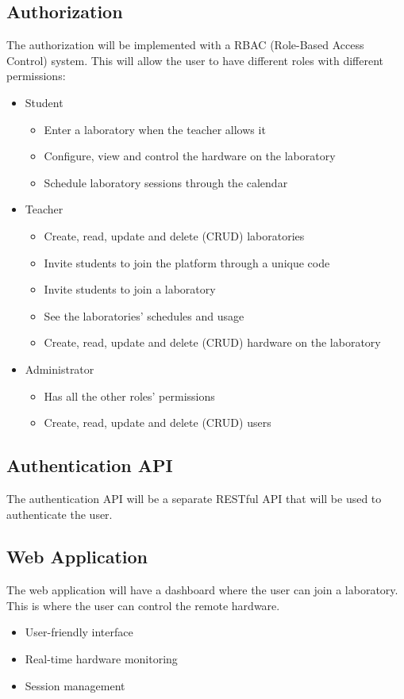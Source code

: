 \documentclass[a4paper,twoside,11pt]{article}
\begin{document}
\subsection*{Authorization}
The authorization will be implemented with a RBAC (Role-Based Access Control) system.
This will allow the user to have different roles with different permissions:
\begin{itemize}
    \item Student
	\begin{itemize}
		\item Enter a laboratory when the teacher allows it
		\item Configure, view and control the hardware on the laboratory
		\item Schedule laboratory sessions through the calendar
	\end{itemize}
	\item Teacher
	\begin{itemize}
		\item Create, read, update and delete (CRUD) laboratories
		\item Invite students to join the platform through a unique code
		\item Invite students to join a laboratory
		\item See the laboratories' schedules and usage
		\item Create, read, update and delete (CRUD) hardware on the laboratory
	\end{itemize}
	\item Administrator
	\begin{itemize}
		\item Has all the other roles' permissions
		\item Create, read, update and delete (CRUD) users
	\end{itemize}
\end{itemize}

\subsection*{Authentication API}
The authentication API will be a separate RESTful API that will be used to authenticate the user.

\subsection*{Web Application}
The web application will have a dashboard where the user can join a laboratory.
This is where the user can control the remote hardware.
\begin{itemize}
    \item User-friendly interface
    \item Real-time hardware monitoring
    \item Session management
\end{itemize}
\end{document}
